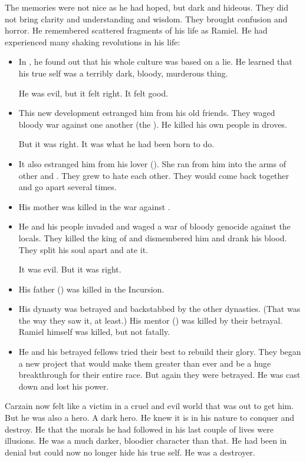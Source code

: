 The memories were not nice as he had hoped, but dark and hideous. 
They did not bring clarity and understanding and wisdom.
They brought confusion and horror. 
He remembered scattered fragments of his life as Ramiel.
He had experienced many shaking revolutions in his life:
\begin{itemize}
  \item 
    In \Merkyrah, he found out that his whole culture was based on a lie.
    He learned that his true self was a terribly dark, bloody, murderous thing.
    
    He was evil, but it felt right.
    It felt good.
  \item 
    This new development estranged him from his old friends.
    They waged bloody war against one another (the ). 
    He killed his own people in droves. 
    
    But it was right.
    It was what he had been born to do. 
  \item 
    It also estranged him from his lover (). 
    She ran from him into the arms of other \resphain and \resviel. 
    They grew to hate each other.
    They would come back together and go apart several times. 
  \item 
    His mother was killed in the war against \Merkyrah.
  \item 
    He and his people invaded \Tembrae and waged a war of bloody genocide against the locals.
    They killed the king of \Tembrae and dismembered him and drank his blood.
    They split his soul apart and ate it.
    
    It was evil. 
    But it was right.
  \item 
    His father (\Nathrach) was killed in the Incursion. 
  \item 
    His dynasty was betrayed and backstabbed by the other dynasties. 
    (That was the way they saw it, at least.)
    His mentor (\Zachirah) was killed by their betrayal.
    Ramiel himself was killed, but not fatally. 
  \item 
    He and his betrayed fellows tried their best to rebuild their glory.
    They began a new project that would make them greater than ever and be a huge breakthrough for their entire race.
    But again they were betrayed.
    He was cast down and lost his power. 
\end{itemize}

Carzain now felt like a victim in a cruel and evil world that was out to get him. 
But he was also a hero. 
A dark hero. 
He knew it is in his nature to conquer and destroy.
He  that the morals he had followed in his last couple of lives were illusions.
He was a much darker, bloodier character than that. 
He had been in denial but could now no longer hide his true self. 
He was a destroyer. 

